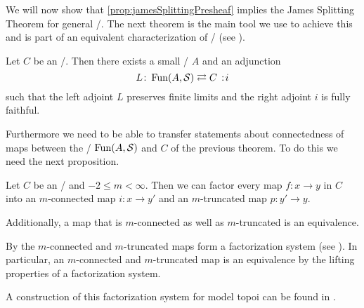 We will now show that \cref{prop:jamesSplittingPresheaf} implies the James Splitting Theorem for general \inftytops/.
The next theorem is the main tool we use to achieve this and is part of an equivalent characterization of \inftytops/ (see \cite[Theorem 6.1.0.6]{HTT}).
\begin{thm}\label{thm:charTopoiByAdj}
    Let $C$ be an \inftytop/.
    Then there exists a small \inftycat/ $A$ and an adjunction
    \begin{equation*}
        L\colon\Fun(A,\spaces)\rightleftarrows C\mkern+3mu:\mkern-3mu i
    \end{equation*}
    such that the left adjoint $L$ preserves finite limits and the right adjoint $i$ is fully faithful.
    \begin{reference}
        \cite[Theorem 6.1.0.6 (1) and (2)]{HTT} %
    \end{reference}
\end{thm}
Furthermore we need to be able to transfer statements about connectedness of maps between the \inftytops/ $\operatorname{Fun}(A,\mathcal{S})$ and $C$ of the previous theorem.
To do this we need the next proposition.
\begin{prop}\label{prop:factorConnTrunc}
    Let $C$ be an \inftytop/ and $-2\leq m<\infty$.
    Then we can factor every map $f\colon x\to y$ in $C$ into an $m$-connected map $i\colon x\to y'$ and an $m$-truncated map $p\colon y'\to y$.
    
    Additionally, a map that is $m$-connected as well as $m$-truncated is an equivalence.
    \begin{reference}
        By \cite[\S 6.5.1 and Example 5.2.8.16]{HTT} the $m$-connected and $m$-truncated maps form a factorization system (see \cite[Definition 5.2.8.8]{HTT}).
        In particular, an $m$-connected and $m$-truncated map is an equivalence by the lifting properties of a factorization system.

        A construction of this factorization system for model topoi can be found in \cite[Proposition 8.5]{toposes_and_htpy_toposes}.
    \end{reference}
\end{prop}
